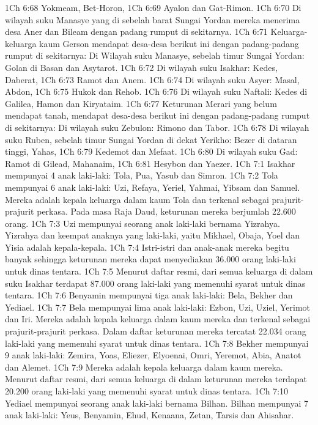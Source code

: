 1Ch 6:68  Yokmeam, Bet-Horon,
1Ch 6:69  Ayalon dan Gat-Rimon.
1Ch 6:70  Di wilayah suku Manasye yang di sebelah barat Sungai Yordan mereka menerima desa Aner dan Bileam dengan padang rumput di sekitarnya.
1Ch 6:71  Keluarga-keluarga kaum Gerson mendapat desa-desa berikut ini dengan padang-padang rumput di sekitarnya: Di Wilayah suku Manasye, sebelah timur Sungai Yordan: Golan di Basan dan Asytarot.
1Ch 6:72  Di wilayah suku Isakhar: Kedes, Daberat,
1Ch 6:73  Ramot dan Anem.
1Ch 6:74  Di wilayah suku Asyer: Masal, Abdon,
1Ch 6:75  Hukok dan Rehob.
1Ch 6:76  Di wilayah suku Naftali: Kedes di Galilea, Hamon dan Kiryataim.
1Ch 6:77  Keturunan Merari yang belum mendapat tanah, mendapat desa-desa berikut ini dengan padang-padang rumput di sekitarnya: Di wilayah suku Zebulon: Rimono dan Tabor.
1Ch 6:78  Di wilayah suku Ruben, sebelah timur Sungai Yordan di dekat Yerikho: Bezer di dataran tinggi, Yahas,
1Ch 6:79  Kedemot dan Mefaat.
1Ch 6:80  Di wilayah suku Gad: Ramot di Gilead, Mahanaim,
1Ch 6:81  Hesybon dan Yaezer.
1Ch 7:1  Isakhar mempunyai 4 anak laki-laki: Tola, Pua, Yasub dan Simron.
1Ch 7:2  Tola mempunyai 6 anak laki-laki: Uzi, Refaya, Yeriel, Yahmai, Yibsam dan Samuel. Mereka adalah kepala keluarga dalam kaum Tola dan terkenal sebagai prajurit-prajurit perkasa. Pada masa Raja Daud, keturunan mereka berjumlah 22.600 orang.
1Ch 7:3  Uzi mempunyai seorang anak laki-laki bernama Yizrahya. Yizrahya dan keempat anaknya yang laki-laki, yaitu Mikhael, Obaja, Yoel dan Yisia adalah kepala-kepala.
1Ch 7:4  Istri-istri dan anak-anak mereka begitu banyak sehingga keturunan mereka dapat menyediakan 36.000 orang laki-laki untuk dinas tentara.
1Ch 7:5  Menurut daftar resmi, dari semua keluarga di dalam suku Isakhar terdapat 87.000 orang laki-laki yang memenuhi syarat untuk dinas tentara.
1Ch 7:6  Benyamin mempunyai tiga anak laki-laki: Bela, Bekher dan Yediael.
1Ch 7:7  Bela mempunyai lima anak laki-laki: Ezbon, Uzi, Uziel, Yerimot dan Iri. Mereka adalah kepala keluarga dalam kaum mereka dan terkenal sebagai prajurit-prajurit perkasa. Dalam daftar keturunan mereka tercatat 22.034 orang laki-laki yang memenuhi syarat untuk dinas tentara.
1Ch 7:8  Bekher mempunyai 9 anak laki-laki: Zemira, Yoas, Eliezer, Elyoenai, Omri, Yeremot, Abia, Anatot dan Alemet.
1Ch 7:9  Mereka adalah kepala keluarga dalam kaum mereka. Menurut daftar resmi, dari semua keluarga di dalam keturunan mereka terdapat 20.200 orang laki-laki yang memenuhi syarat untuk dinas tentara.
1Ch 7:10  Yediael mempunyai seorang anak laki-laki bernama Bilhan. Bilhan mempunyai 7 anak laki-laki: Yeus, Benyamin, Ehud, Kenaana, Zetan, Tarsis dan Ahisahar.
